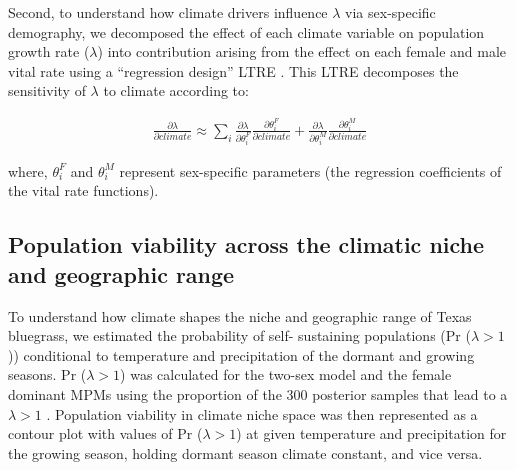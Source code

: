 \documentclass[9pt,twocolumn,twoside,lineno]{pnas-new}
\newcommand{\tom}[2]{{\color{red}{#1}}\footnote{\textit{\color{red}{#2}}}}
\newcommand{\jacob}[2]{{\color{blue}{#1}}\footnote{\textit{\color{blue}{#2}}}}
\begin{document}
Second, to understand how climate drivers influence $\lambda$ via sex-specific demography, we decomposed the effect of each climate variable on population growth rate ($\lambda$) into contribution arising from the effect on each female and male vital rate using a ``regression design'' LTRE \citep{caswell1989analysis}.
This LTRE decomposes the sensitivity of $\lambda$ to climate according to:

\begin{align}\label{eq:ltresex}
\frac{\partial \lambda}{\partial climate} \approx \sum_{i} \frac{\partial \lambda}{\partial \theta^{F}_{i}} \frac{\partial \theta^{F}_{i}}{\partial climate} + \frac{\partial \lambda}{\partial \theta^{M}_{i}} \frac{\partial \theta^{M}_{i}}{\partial climate}
\end{align}

\noindent where, $\theta^{F}_{i}$ and $\theta^{M}_{i}$ represent sex-specific parameters (the regression coefficients of the vital rate functions). 

\subsection*{Population viability across the climatic niche and geographic range}
To understand how climate shapes the niche and geographic range of Texas bluegrass, we estimated the probability of self- sustaining populations (Pr ($\lambda > 1$)) conditional to temperature and precipitation of the dormant and growing seasons.
Pr ($\lambda > 1$) was calculated for the two-sex model and the female dominant MPMs using the proportion of the 300 posterior samples that lead to a $\lambda > 1$ \citep{diez2014probabilistic}.
Population viability in climate niche space was then represented as a contour plot with values of Pr ($\lambda > 1$) at given temperature and precipitation for the growing season, holding dormant season climate constant, and vice versa. 
\end{document}
